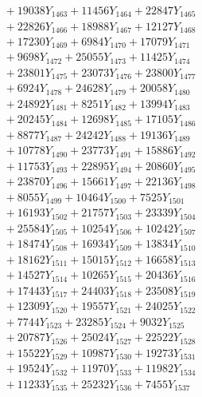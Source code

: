 \documentclass[a4paper,10pt]{article}
\begin{document}
{\begin{align}
&\;  + 19038 Y_{1463} + 11456 Y_{1464} + 22847 Y_{1465} \\[0.3ex]
&\;  + 22826 Y_{1466} + 18988 Y_{1467} + 12127 Y_{1468} \\[0.5ex]\allowbreak
&\;  + 17230 Y_{1469} + 6984 Y_{1470} + 17079 Y_{1471} \\[0.3ex]
&\;  + 9698 Y_{1472} + 25055 Y_{1473} + 11425 Y_{1474} \\[0.3ex]
&\;  + 23801 Y_{1475} + 23073 Y_{1476} + 23800 Y_{1477} \\[0.3ex]
&\;  + 6924 Y_{1478} + 24628 Y_{1479} + 20058 Y_{1480} \\[0.3ex]
&\;  + 24892 Y_{1481} + 8251 Y_{1482} + 13994 Y_{1483} \\[0.3ex]
&\;  + 20245 Y_{1484} + 12698 Y_{1485} + 17105 Y_{1486} \\[0.3ex]
&\;  + 8877 Y_{1487} + 24242 Y_{1488} + 19136 Y_{1489} \\[0.3ex]
&\;  + 10778 Y_{1490} + 23773 Y_{1491} + 15886 Y_{1492} \\[0.3ex]
&\;  + 11753 Y_{1493} + 22895 Y_{1494} + 20860 Y_{1495} \\[0.3ex]
&\;  + 23870 Y_{1496} + 15661 Y_{1497} + 22136 Y_{1498} \\[0.5ex]\allowbreak
&\;  + 8055 Y_{1499} + 10464 Y_{1500} + 7525 Y_{1501} \\[0.3ex]
&\;  + 16193 Y_{1502} + 21757 Y_{1503} + 23339 Y_{1504} \\[0.3ex]
&\;  + 25584 Y_{1505} + 10254 Y_{1506} + 10242 Y_{1507} \\[0.3ex]
&\;  + 18474 Y_{1508} + 16934 Y_{1509} + 13834 Y_{1510} \\[0.3ex]
&\;  + 18162 Y_{1511} + 15015 Y_{1512} + 16658 Y_{1513} \\[0.3ex]
&\;  + 14527 Y_{1514} + 10265 Y_{1515} + 20436 Y_{1516} \\[0.3ex]
&\;  + 17443 Y_{1517} + 24403 Y_{1518} + 23508 Y_{1519} \\[0.3ex]
&\;  + 12309 Y_{1520} + 19557 Y_{1521} + 24025 Y_{1522} \\[0.3ex]
&\;  + 7744 Y_{1523} + 23285 Y_{1524} + 9032 Y_{1525} \\[0.3ex]
&\;  + 20787 Y_{1526} + 25024 Y_{1527} + 22522 Y_{1528} \\[0.5ex]\allowbreak
&\;  + 15522 Y_{1529} + 10987 Y_{1530} + 19273 Y_{1531} \\[0.3ex]
&\;  + 19524 Y_{1532} + 11970 Y_{1533} + 11982 Y_{1534} \\[0.3ex]
&\;  + 11233 Y_{1535} + 25232 Y_{1536} + 7455 Y_{1537} \\[0.3ex]

\end{align}}
\end{document}
